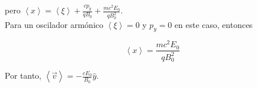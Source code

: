 \begin{solution}
pero $\left\langle x\right\rangle =\left\langle \xi\right\rangle +\frac{cp_{y}}{qB_{0}}+\frac{mc^{2}E_{0}}{qB_{0}^{2}}$.\\

Para un oscilador armónico $\left\langle \xi\right\rangle =0$ y $p_{y}=0$
en este caso, entonces

\[
\left\langle x\right\rangle =\frac{mc^{2}E_{0}}{qB_{0}^{2}}
\]

Por tanto, $\left\langle \vec{v}\right\rangle =-\frac{cE_{0}}{B_{0}}\hat{y}$.

\end{solution}
